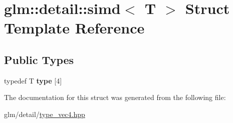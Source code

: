 \hypertarget{structglm_1_1detail_1_1simd}{\section{glm\-:\-:detail\-:\-:simd$<$ T $>$ Struct Template Reference}
\label{structglm_1_1detail_1_1simd}
}
\subsection*{Public Types}
\begin{DoxyCompactItemize}
\item 
\hypertarget{structglm_1_1detail_1_1simd_a7466f2c2e1906934e093d69266bfb1b2}{typedef T {\bfseries type} \mbox{[}4\mbox{]}}\label{structglm_1_1detail_1_1simd_a7466f2c2e1906934e093d69266bfb1b2}

\end{DoxyCompactItemize}


The documentation for this struct was generated from the following file\-:\begin{DoxyCompactItemize}
\item 
glm/detail/\hyperlink{type__vec4_8hpp}{type\-\_\-vec4.\-hpp}\end{DoxyCompactItemize}

